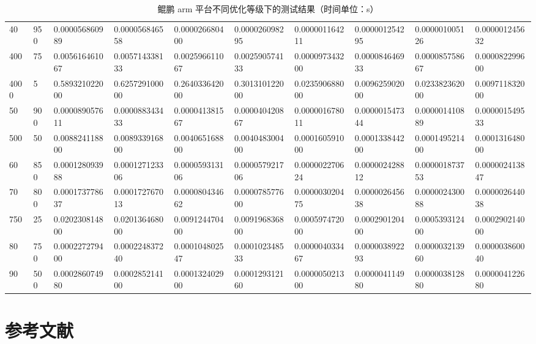 \documentclass[a4paper]{article}
\begin{document}
\begin{table}[]
{\begin{tabular}{llllllllll}
      40   & 950    & 0.000056860989 & 0.000056846558 & 0.000026680400 & 0.000026098295 & 0.000001164211 & 0.000001254295 & 0.000001005126 & 0.000001245632 \\
      400  & 75     & 0.005616461067 & 0.005714338133 & 0.002596611067 & 0.002590574133 & 0.000097343200 & 0.000084646933 & 0.000085758667 & 0.000082299600 \\
      4000 & 5      & 0.589321022000 & 0.625729100000 & 0.264033642000 & 0.301310122000 & 0.023590688000 & 0.009625902000 & 0.023382362000 & 0.009711832000 \\
      50   & 900    & 0.000089057611 & 0.000088343433 & 0.000041381567 & 0.000040420867 & 0.000001678011 & 0.000001547344 & 0.000001410889 & 0.000001549533 \\
      500  & 50     & 0.008824118800 & 0.008933916800 & 0.004065168800 & 0.004048300400 & 0.000160591000 & 0.000133844200 & 0.000149521400 & 0.000131648000 \\
      60   & 850    & 0.000128093988 & 0.000127123306 & 0.000059313106 & 0.000057921706 & 0.000002270624 & 0.000002428812 & 0.000001873753 & 0.000002413847 \\
      70   & 800    & 0.000173778637 & 0.000172767013 & 0.000080434662 & 0.000078577600 & 0.000003020475 & 0.000002645638 & 0.000002430088 & 0.000002644038 \\
      750  & 25     & 0.020230814800 & 0.020136468000 & 0.009124470400 & 0.009196836800 & 0.000597472000 & 0.000290120400 & 0.000539312400 & 0.000290214000 \\
      80   & 750    & 0.000227279400 & 0.000224837240 & 0.000104802547 & 0.000102348533 & 0.000004033467 & 0.000003892293 & 0.000003213960 & 0.000003860040 \\
      90   & 500    & 0.000286074980 & 0.000285214100 & 0.000132402900 & 0.000129312160 & 0.000005021300 & 0.000004114980 & 0.000003812880 & 0.000004122680
    \end{tabular}%
  }
  \caption{鲲鹏 arm 平台不同优化等级下的测试结果（时间单位：s）}
  \label{tab:arm-test}
\end{table}

\newpage

\section{参考文献}
\cite{1}\cite{2}\cite{3}\cite{4}\cite{5}\cite{6}



\end{document}
